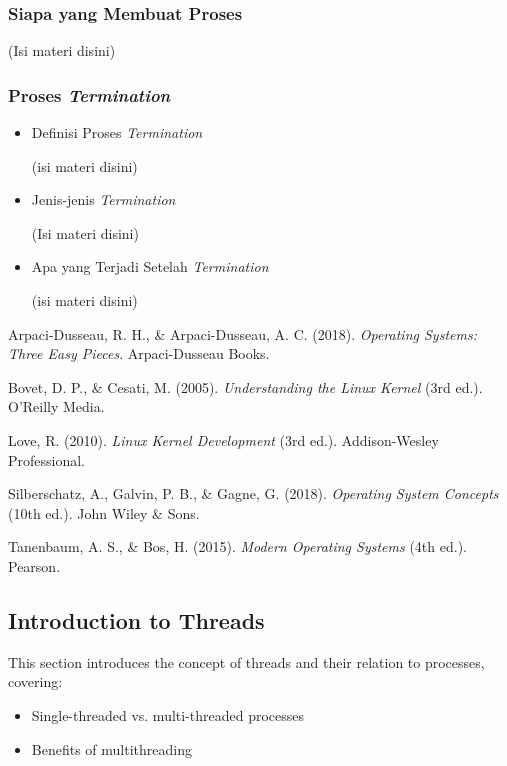\documentclass[12pt]{article}
\begin{document}
\subsubsection{Siapa yang Membuat Proses}
(Isi materi disini)

\subsubsection{Proses \textit{Termination}}
\begin{itemize}
    \item Definisi Proses \textit{Termination}
    
    (isi materi disini)

    \item Jenis-jenis \textit{Termination}
    
    (Isi materi disini)

    \item Apa yang Terjadi Setelah \textit{Termination}
    
    (isi materi disini)
\end{itemize}

\begin{thebibliography}{99}

    Arpaci-Dusseau, R. H., \& Arpaci-Dusseau, A. C. (2018). \textit{Operating Systems: Three Easy Pieces}. Arpaci-Dusseau Books.

    Bovet, D. P., \& Cesati, M. (2005). \textit{Understanding the Linux Kernel} (3rd ed.). O'Reilly Media.

    Love, R. (2010). \textit{Linux Kernel Development} (3rd ed.). Addison-Wesley Professional.

    Silberschatz, A., Galvin, P. B., \& Gagne, G. (2018). \textit{Operating System Concepts} (10th ed.). John Wiley \& Sons.

    Tanenbaum, A. S., \& Bos, H. (2015). \textit{Modern Operating Systems} (4th ed.). Pearson.

\end{thebibliography}

\subsection{Introduction to Threads}
This section introduces the concept of threads and their relation to processes, covering:
\begin{itemize}
    \item Single-threaded vs. multi-threaded processes
    \item Benefits of multithreading
\end{itemize}
\end{document}
